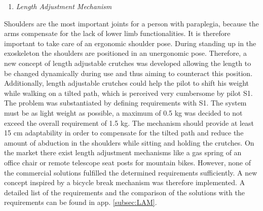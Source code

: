 \documentclass[conference,a4paper]{IEEEtran}
\begin{document}
\begin{enumerate}[\textit{ii.}]
\item{\textit{Length Adjustment Mechanism}}
\end{enumerate}
Shoulders are the most important joints for a person with paraplegia, because the arms compensate for the lack of lower limb functionalities. It is therefore important to take care of an ergonomic shoulder pose. During standing up in the exoskeleton the shoulders are positioned in an unergonomic pose. Therefore, a new concept of length adjustable crutches was developed allowing the length to be changed dynamically during use and thus aiming to counteract this position. Additionally, length adjustable crutches could help the pilot to shift his weight while walking on a tilted path, which is perceived very cumbersome by pilot S1.
The problem was substantiated by defining requirements with S1. The system must be as light weight as possible, a maximum of 0.5 kg was decided to not exceed the overall requirement of 1.5 kg. The mechanism should provide at least 15 cm adaptability in order to compensate for the tilted path and reduce the amount of abduction in the shoulders while sitting and holding the crutches.
On the market there exist length adjustment mechanisms like a gas spring of an office chair or remote telescope seat posts for mountain bikes. However, none of the commercial solutions fulfilled the determined requirements sufficiently. A new concept inspired by a bicycle break mechanism was therefore implemented. A detailed list of the requirements and the comparison of the solutions with the requirements can be found in app. \ref{subsec:LAM}.
\end{document}
